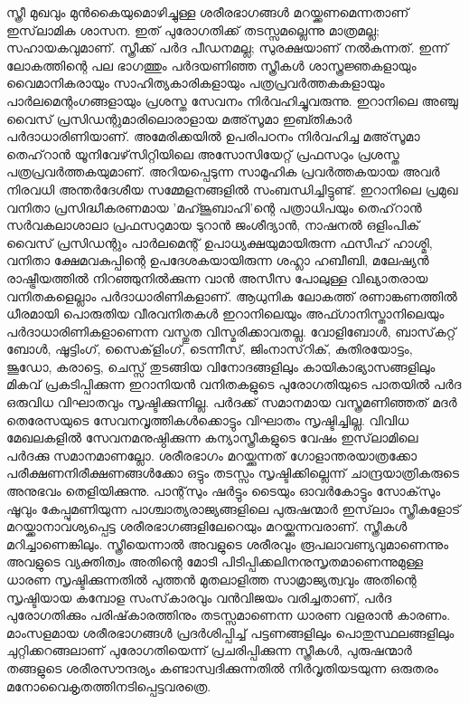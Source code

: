  സ്ത്രീ മുഖവും മുന്‍കൈയുമൊഴിച്ചുള്ള ശരീരഭാഗങ്ങള്‍ മറയ്ക്കണമെന്നതാണ് ഇസ്‌ലാമിക ശാസന. ഇത് പുരോഗതിക്ക് തടസ്സമല്ലെന്നു മാത്രമല്ല; സഹായകവുമാണ്. സ്ത്രീക്ക് പര്‍ദ പീഡനമല്ല; സുരക്ഷയാണ് നല്‍കുന്നത്.
ഇന്ന് ലോകത്തിന്റെ പല ഭാഗത്തും പര്‍ദയണിഞ്ഞ സ്ത്രീകള്‍ ശാസ്ത്രജ്ഞകളായും വൈമാനികരായും സാഹിത്യകാരികളായും പത്രപ്രവര്‍ത്തകകളായും പാര്‍ലമെന്റംഗങ്ങളായും പ്രശസ്ത സേവനം നിര്‍വഹിച്ചുവരുന്നു. ഇറാനിലെ അഞ്ചു വൈസ് പ്രസിഡന്റുമാരിലൊരാളായ മഅ്‌സൂമാ ഇബ്തികാര്‍ പര്‍ദാധാരിണിയാണ്. അമേരിക്കയില്‍ ഉപരിപഠനം നിര്‍വഹിച്ച മഅ്‌സൂമാ തെഹ്‌റാന്‍ യൂനിവേഴ്‌സിറ്റിയിലെ അസോസിയേറ്റ് പ്രഫസറും പ്രശസ്ത പത്രപ്രവര്‍ത്തകയുമാണ്. അറിയപ്പെടുന്ന സാമൂഹിക പ്രവര്‍ത്തകയായ അവര്‍ നിരവധി അന്തര്‍ദേശീയ സമ്മേളനങ്ങളില്‍ സംബന്ധിച്ചിട്ടുണ്ട്. ഇറാനിലെ പ്രമുഖ വനിതാ പ്രസിദ്ധീകരണമായ 'മഹ്ജൂബാഹി'ന്റെ പത്രാധിപയും തെഹ്‌റാന്‍ സര്‍വകലാശാലാ പ്രഫസറുമായ ടുറാന്‍ ജംശീദ്യാന്‍, നാഷനല്‍ ഒളിംപിക് വൈസ് പ്രസിഡന്റും പാര്‍ലമെന്റ് ഉപാധ്യക്ഷയുമായിരുന്ന ഫസീഹ് ഹാശ്മി, വനിതാ ക്ഷേമവകുപ്പിന്റെ ഉപദേശകയായിരുന്ന ശഹ്ലാ ഹബീബി, മലേഷ്യന്‍ രാഷ്ട്രീയത്തില്‍ നിറഞ്ഞുനില്‍ക്കുന്ന വാന്‍ അസീസ പോലുള്ള വിഖ്യാതരായ വനിതകളെല്ലാം പര്‍ദാധാരിണികളാണ്. ആധുനിക ലോകത്ത് രണാങ്കണത്തില്‍ ധീരമായി പൊരുതിയ വീരവനിതകള്‍ ഇറാനിലെയും അഫ്ഗാനിസ്താനിലെയും പര്‍ദാധാരിണികളാണെന്ന വസ്തുത വിസ്മരിക്കാവതല്ല. വോളിബോള്‍, ബാസ്‌കറ്റ് ബോള്‍, ഷൂട്ടിംഗ്, സൈക്‌ളിംഗ്, ടെന്നീസ്, ജിംനാസ്‌റിക്, കുതിരയോട്ടം, ജൂഡോ, കരാട്ടെ, ചെസ്സ് തുടങ്ങിയ വിനോദങ്ങളിലും കായികാഭ്യാസങ്ങളിലും മികവ് പ്രകടിപ്പിക്കുന്ന ഇറാനിയന്‍ വനിതകളുടെ പുരോഗതിയുടെ പാതയില്‍ പര്‍ദ ഒരുവിധ വിഘാതവും സൃഷ്ടിക്കുന്നില്ല. പര്‍ദക്ക് സമാനമായ വസ്ത്രമണിഞ്ഞത് മദര്‍ തെരേസയുടെ സേവനവൃത്തികള്‍ക്കൊട്ടും വിഘാതം സൃഷ്ടിച്ചില്ല. വിവിധ മേഖലകളില്‍ സേവനമനുഷ്ഠിക്കുന്ന കന്യാസ്ത്രീകളുടെ വേഷം ഇസ്‌ലാമിലെ പര്‍ദക്കു സമാനമാണല്ലോ. ശരീരഭാഗം മറയ്ക്കുന്നത് ഗോളാന്തരയാത്രക്കോ പരീക്ഷണനിരീക്ഷണങ്ങള്‍ക്കോ ഒട്ടും തടസ്സം സൃഷ്ടിക്കില്ലെന്ന് ചാന്ദ്രയാത്രികരുടെ അനുഭവം തെളിയിക്കുന്നു. പാന്റ്‌സും ഷര്‍ട്ടും ടൈയും ഓവര്‍കോട്ടും സോക്‌സും ഷൂവും കേപ്പുമണിയുന്ന പാശ്ചാത്യരാജ്യങ്ങളിലെ പുരുഷന്മാര്‍ ഇസ്‌ലാം സ്ത്രീകളോട് മറയ്ക്കാനാവശ്യപ്പെട്ട ശരീരഭാഗങ്ങളിലേറെയും മറയ്ക്കുന്നവരാണ്. സ്ത്രീകള്‍ മറിച്ചാണെങ്കിലും.
സ്ത്രീയെന്നാല്‍ അവളുടെ ശരീരവും രൂപലാവണ്യവുമാണെന്നും അവളുടെ വ്യക്തിത്വം അതിന്റെ മോടി പിടിപ്പിക്കലിനനുസൃതമാണെന്നുമുള്ള ധാരണ സൃഷ്ടിക്കുന്നതില്‍ പുത്തന്‍ മുതലാളിത്ത സാമ്രാജ്യത്വവും അതിന്റെ സൃഷ്ടിയായ കമ്പോള സംസ്‌കാരവും വന്‍വിജയം വരിച്ചതാണ്, പര്‍ദ പുരോഗതിക്കും പരിഷ്‌കാരത്തിനും തടസ്സമാണെന്ന ധാരണ വളരാന്‍ കാരണം. മാംസളമായ ശരീരഭാഗങ്ങള്‍ പ്രദര്‍ശിപ്പിച്ച് പട്ടണങ്ങളിലും പൊതുസ്ഥലങ്ങളിലും ചുറ്റിക്കറങ്ങലാണ് പുരോഗതിയെന്ന് പ്രചരിപ്പിക്കുന്ന സ്ത്രീകള്‍, പുരുഷന്മാര്‍ തങ്ങളുടെ ശരീരസൗന്ദര്യം കണ്ടാസ്വദിക്കുന്നതില്‍ നിര്‍വൃതിയടയുന്ന ഒരുതരം മനോവൈകൃതത്തിനടിപ്പെട്ടവരത്രെ.
